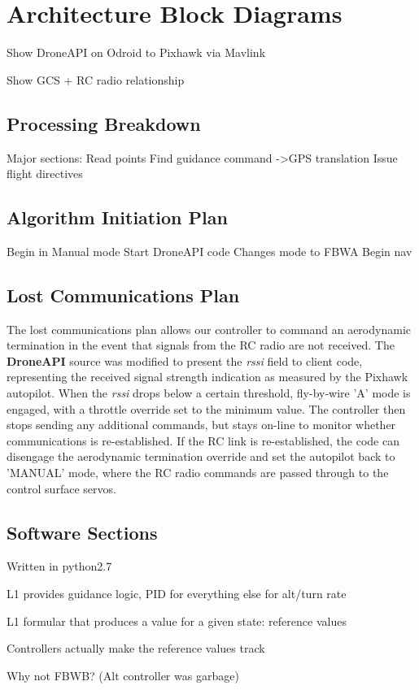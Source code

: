 \documentclass{aiaa}
\begin{document}
\section{Architecture Block Diagrams}
Show DroneAPI on Odroid to Pixhawk via Mavlink

Show GCS + RC radio relationship

\subsection{Processing Breakdown}

Major sections:
Read points
Find guidance command
->GPS translation
Issue flight directives

\subsection{Algorithm Initiation Plan}
Begin in Manual mode
Start DroneAPI code
Changes mode to FBWA
Begin nav
\subsection{Lost Communications Plan}
The lost communications plan allows our controller to command an aerodynamic termination in the event that signals from the RC radio are not received. The \textbf{DroneAPI} source was modified to present the \textit{rssi} field to client code, representing the received signal strength indication as measured by the Pixhawk autopilot. When the \textit{rssi} drops below a certain threshold, fly-by-wire 'A' mode is engaged, with a throttle override set to the minimum value. The controller then stops sending any additional commands, but stays on-line to monitor whether communications is re-established. If the RC link is re-established, the code can disengage the aerodynamic termination override and set the autopilot back to 'MANUAL' mode, where the RC radio commands are passed through to the control surface servos.
\subsection{Software Sections}
Written in python2.7

L1 provides guidance logic, PID for everything else for alt/turn rate

L1 formular that produces a value for a given state: reference values

Controllers actually make the reference values track

Why not FBWB? (Alt controller was garbage)
\end{document}

